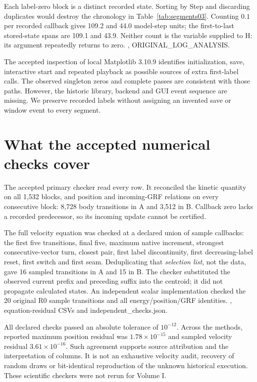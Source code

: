 Each label-zero block is a distinct recorded state. Sorting by Step and
discarding duplicates would destroy the chronology in
Table~\ref{tab:segments03}. Counting $0.1$ per recorded callback gives
109.2 and 44.0 model-step units; the first-to-last stored-state spans
are 109.1 and 43.9. Neither count is the variable supplied to H:
its argument repeatedly returns to zero.
\cite{study03}, ORIGINAL\_LOG\_ANALYSIS. 

The accepted inspection of local Matplotlib 3.10.9 identifies
initialization, save, interactive start and repeated playback as
possible sources of extra first-label calls. The observed singleton
zeros and complete passes are consistent with those paths. However,
the historic library, backend and GUI event sequence are missing.
We preserve recorded labels without assigning an invented save or
window event to every segment. 

\section{What the accepted numerical checks cover}
The accepted primary checker read every row. It reconciled the kinetic
quantity on all 1,532 blocks, and position and incoming-GRF relations
on every consecutive block: 8,728 body transitions in A and 3,512 in B.
Callback zero lacks a recorded predecessor, so its incoming update
cannot be certified. 

The full velocity equation was checked at a declared union of sample
callbacks: the first five transitions, final five, maximum native
increment, strongest consecutive-vector turn, closest pair, first
label discontinuity, first decreasing-label reset, first switch and
first seam. Deduplicating that \emph{selection list}, not the data,
gave 16 sampled transitions in A and 15 in B. The checker substituted
the observed current prefix and preceding suffix into the centroid;
it did not propagate calculated states. An independent scalar
implementation checked the 20 original R0 sample transitions and
all energy/position/GRF identities.
\cite{study03}, equation-residual CSVs and independent\_checks.json.

All declared checks passed an absolute tolerance of $10^{-12}$.
Across the methods, reported maximum position residual was
$1.78\times10^{-15}$ and sampled velocity residual
$3.61\times10^{-16}$. Such agreement supports source attribution and
the interpretation of columns. It is not an exhaustive velocity
audit, recovery of random draws or bit-identical reproduction of
the unknown historical execution. These scientific checkers were
not rerun for Volume I. 

